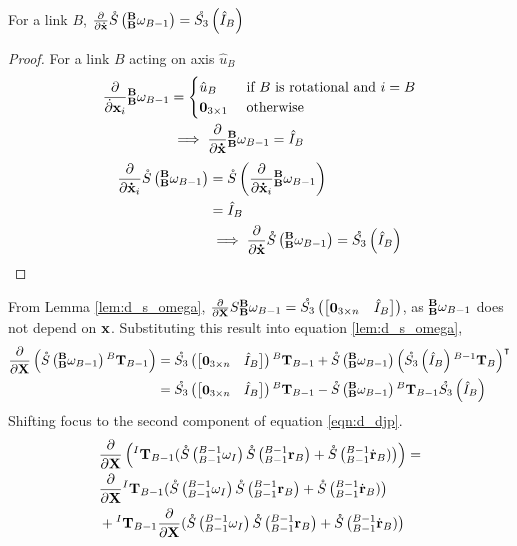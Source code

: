 \begin{lemma} \label{lem:d_s_omega}
For a link $B$, $\frac{\partial}{\partial \dotx}\S{\BB\omega_{B-1}} = \Sn{\IHat_B}$
\begin{proof}
\noindent For a link $B$ acting on axis $\hat{u}_B$
\begin{align*}
    \frac{\partial}{\dot\partial \x_i}{\BB\omega_{B-1}} &= \begin{cases}
    \hat{u}_B & \text{ if $B$ is rotational and  } i = B \\
    \ZERO_{3 \times 1} & \text{ otherwise }
    \end{cases} \\ 
    &\implies \partialxdot{}{\BB\omega_{B-1}} = \IHat_B
\end{align*}
\begin{align*}
    \frac{\partial}{\partial \dotx_i}\S{\BB\omega_{B-1}} &= \S{\frac{\partial}{\partial \dotx_i}{\BB\omega_{B-1}}}\\
    &= \IHat_B \\
    &\implies \partialxdot{}{\S{\BB\omega_{B-1}}} = \Sn{\IHat_B}
\end{align*}
\end{proof}
\end{lemma}
From Lemma \ref{lem:d_s_omega}, $\partialX{}S{\BB\omega_{B-1}} = \Sn{\begin{bmatrix}
\ZERO_{3 \times n} & \IHat_B
\end{bmatrix}}$, as $\BB\omega_{B-1}$ does not depend on $\x$. Substituting this result into equation \ref{lem:d_s_omega}, 
\begin{align}
    \partialX{}\left (\S{\BB\omega_{B-1}}{^B\T_{B-1}} \right ) &= \Sn{\begin{bmatrix}
\ZERO_{3 \times n} & \IHat_B
\end{bmatrix}}{^B\T_{B-1}} + \S{\BB\omega_{B-1}}\left (\Sn{\IHat_B}{^{B-1}\T_{B}} \right )\transpose \nonumber \\
&= \Sn{\begin{bmatrix}
\ZERO_{3 \times n} & \IHat_B
\end{bmatrix}}{^B\T_{B-1}} - \S{\BB\omega_{B-1}}{^B\T_{B-1}}\Sn{\IHat_B}  \label{eqn:d_djp_upper}
\end{align}
Shifting focus to the second component of equation \ref{eqn:d_djp}.
\begin{align*}
    &\partialX{}\left ({^I\T_{B-1}}
	(\S{^{B-1}_{B-1}\omega_I}\S{^{B-1}_{B-1}\r_B}+\S{^{B-1}_{B-1}\dotr_B)} \right ) = \\ 
	&\partialX{} {^I\T_{B-1}} (\S{^{B-1}_{B-1}\omega_I}\S{^{B-1}_{B-1}\r_B}+\S{^{B-1}_{B-1}\dotr_B)} \\&+ {^I\T_{B-1}}
	\partialX{}(\S{^{B-1}_{B-1}\omega_I}\S{^{B-1}_{B-1}\r_B}+\S{^{B-1}_{B-1}\dotr_B)} 
\end{align*}
